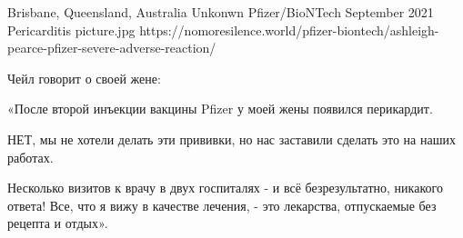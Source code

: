 {Brisbane, Queensland, Australia}
{Unkonwn}
{Pfizer/BioNTech}
{September 2021}
{Pericarditis}
{picture.jpg}
{https://nomoresilence.world/pfizer-biontech/ashleigh-pearce-pfizer-severe-adverse-reaction/}
{

Чейл говорит о своей жене:

«После второй инъекции вакцины Pfizer у моей жены появился перикардит.

НЕТ, мы не хотели делать эти прививки, но нас заставили сделать это на наших
работах.

Несколько визитов к врачу в двух госпиталях - и всё безрезультатно, никакого
ответа! Все, что я вижу в качестве лечения, - это лекарства, отпускаемые без
рецепта и отдых».

}

